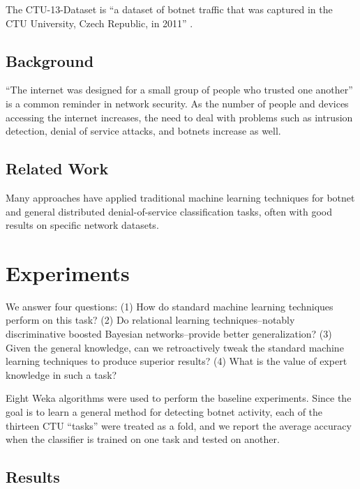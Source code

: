 \documentclass[letterpaper]{article}
\begin{document}
The CTU-13-Dataset is ``a dataset of botnet traffic that was captured in the CTU University, Czech Republic, in 2011'' \cite{garcia2014empirical}.

\subsection{Background}

``The internet was designed for a small group of people who trusted one another'' is a common reminder in network security. As the number of people and devices accessing the internet increases, the need to deal with problems such as intrusion detection, denial of service attacks, and botnets increase as well.

\subsection{Related Work}

Many approaches have applied traditional machine learning techniques for botnet and general distributed denial-of-service classification tasks, often with good results on specific network datasets.

\section{Experiments}

We answer four questions: (1) How do standard machine learning techniques perform on this task? (2) Do relational learning techniques--notably discriminative boosted Bayesian networks--provide better generalization? (3) Given the general knowledge, can we retroactively tweak the standard machine learning techniques to produce superior results? (4) What is the value of expert knowledge in such a task?

Eight Weka \cite{witten2016data} algorithms were used to perform the baseline experiments. Since the goal is to learn a general method for detecting botnet activity, each of the thirteen CTU ``tasks'' were treated as a fold, and we report the average accuracy when the classifier is trained on one task and tested on another.

\subsection{Results}
\end{document}
